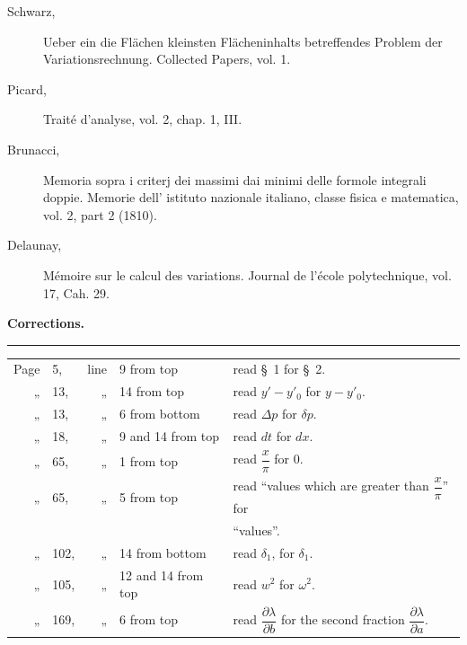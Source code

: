 \documentclass[11pt,a4paper,leqno]{article}
\begin{document}
\begin{description}
\item[Schwarz,] Ueber ein die Flächen kleinsten Flächeninhalts betreffendes
Problem der Variationsrechnung. Collected Papers, vol. 1.

\item[Picard,] Traité d'analyse, vol. 2, chap. 1, III.

\item[Brunacci,] Memoria sopra i criterj dei massimi dai minimi delle formole
integrali doppie. Memorie dell' istituto nazionale italiano, classe fisica e
matematica, vol. 2, part 2 (1810).

\item[Delaunay,] Mémoire sur le calcul des variations. Journal de l'école
polytechnique, vol. 17, Cah. 29.
\end{description}


\begin{center}
{\Large\bfseries Corrections.}

\rule{1.8cm}{0.4pt}
\end{center}

\begin{tabular}{@{}r@{\ }l@{\ }r@{\ }l@{\ }l@{}}
Page & 5,   & line & 9 from top       & read \S~1 for \S~2.\\
„    & 13,  & „    & 14 from top      & read $y'-y'_0$ for $y-y'_0$.\\
„    & 13,  & „    & 6 from bottom    & read $\Delta p$ for $\delta p$.\\
„    & 18,  & „    & 9 and 14 from top& read $dt$ for $dx$.\\
„    & 65,  & „    & 1 from top       & read $\dfrac{x}{\pi}$ for 0.\\
„    & 65,  & „    & 5 from top       & read “values which are greater than $\dfrac{x}{\pi}$” for\\
     &      &      &                  & “values”.\\
„    & 102, & „    & 14 from bottom   & read $\delta_1$, for $\delta_1$.\\
„    & 105, & „    & 12 and 14 from top& read $w^2$ for $\omega^2$.\\
„    & 169, & „    & 6 from top       & read $\dfrac{\partial\lambda}{\partial b}$ for the second fraction
                                            $\dfrac{\partial\lambda}{\partial a}$.\\
\end{tabular}
\end{document}
